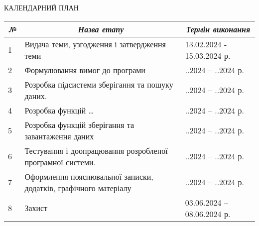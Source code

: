 \documentclass[a4paper, 14pt]{article}
\begin{document}
\noindent
\begin{center}
    КАЛЕНДАРНИЙ ПЛАН \par \null \par
    \end{center}
  \begin{tabular}{|p{1em} | p{17em} | p{11em}|}
     \hline
        \multicolumn{1}{|c|}{\textit{№}} & \multicolumn{1}{c}{\textit{Назва етапу}} & \multicolumn{1}{|c|}{\textit{Термін виконання}} \\ \hline
    1 & Видача теми, узгодження і затвердження теми & 13.02.2024 - 15.03.2024 р. \\ \hline
    2 & Формулювання вимог до програми & \hspace{1em}.\hspace{1em}.2024 – \hspace{1em}.\hspace{1em}.2024 р. \\ \hline
    3 & Розробка підсистеми зберігання та пошуку даних. & \hspace{1em}.\hspace{1em}.2024 – \hspace{1em}.\hspace{1em}.2024 р. \\ \hline
    4 & Розробка функцій \ldots & \hspace{1em}.\hspace{1em}.2024 – \hspace{1em}.\hspace{1em}.2024 р. \\ \hline
    5 & Розробка функцій зберігання та завантаження даних & \hspace{1em}.\hspace{1em}.2024 – \hspace{1em}.\hspace{1em}.2024 р. \\ \hline
    6 & Тестування і доопрацювання розробленої програмної системи. & \hspace{1em}.\hspace{1em}.2024 – \hspace{1em}.\hspace{1em}.2024 р. \\ \hline
    7 & Оформлення пояснювальної записки, додатків, графічного матеріалу & \hspace{1em}.\hspace{1em}.2024 – \hspace{1em}.\hspace{1em}.2024 р. \\ \hline
    8 & Захист & \hspace{0.01em}03.\hspace{0.01em}06.2024 – \hspace{0.01em}08.\hspace{0.01em}06.2024 р. \\ \hline
  \end{tabular}
\end{document}
